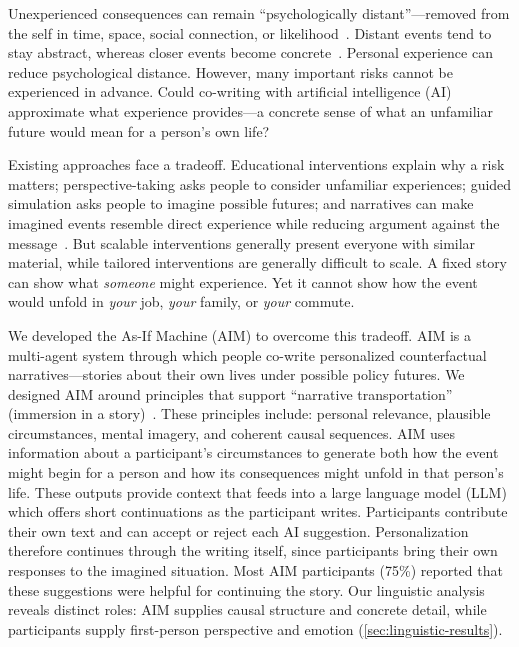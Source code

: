 \documentclass[11pt]{article}
\begin{document}
 Unexperienced consequences can remain ``psychologically distant''---removed from the self in time, space, social connection, or likelihood~\cite{liberman_traversing_2014,williams_psychological_2014,baltatescu_psychological_2016,trope_construal_2007,liberman_construal-level_2008,trope_construal-level_2010}. Distant events tend to stay abstract, whereas closer events become concrete~\citep{soderberg_effects_2015}. Personal experience can reduce psychological distance. However, many important risks cannot be experienced in advance. Could co-writing with artificial intelligence (AI) approximate what experience provides---a concrete sense of what an unfamiliar future would mean for a person's own life?



Existing approaches face a tradeoff. Educational interventions explain why a risk matters; perspective-taking asks people to consider unfamiliar experiences; guided simulation asks people to imagine possible futures; and narratives can make imagined events resemble direct experience while reducing argument against the message~\cite{pham_thought_1999,lee_using_2020,green_interactive_2014,green_need_2020,green_transportation_2004,green_transportation_2012}. But scalable interventions generally present everyone with similar material, while tailored interventions are generally difficult to scale. A fixed story can show what \textit{someone} might experience. Yet it cannot show how the event would unfold in \textit{your} job, \textit{your} family, or \textit{your }commute.

We developed the As-If Machine (AIM) to overcome this tradeoff. AIM is a multi-agent system through which people co-write personalized counterfactual narratives---stories about their own lives under possible policy futures. We designed AIM around principles that support ``narrative transportation'' (immersion in a story)~\citep{green_transportation_2021}. These principles include: personal relevance, plausible circumstances, mental imagery, and coherent causal sequences. AIM uses information about a participant's circumstances to generate both how the event might begin for a person and how its consequences might unfold in that person's life. These outputs provide context that feeds into a large language model (LLM) which offers short continuations as the participant writes. Participants contribute their own text and can accept or reject each AI suggestion. Personalization therefore continues through the writing itself, since participants bring their own responses to the imagined situation. Most AIM participants (75\%) reported that these suggestions were helpful for continuing the story. Our linguistic analysis reveals distinct roles: AIM supplies causal structure and concrete detail, while participants supply first-person perspective and emotion (\autoref{sec:linguistic-results}).
\end{document}
